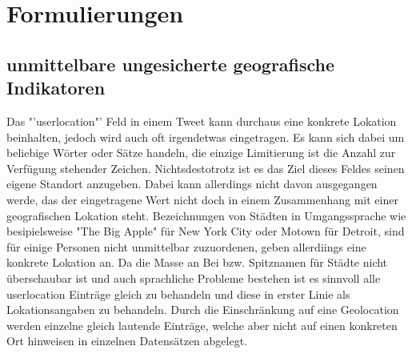 	  \section{Formulierungen}
	  	\subsection{unmittelbare ungesicherte geografische Indikatoren}
	  		Das "'userlocation"' Feld in einem Tweet kann durchaus eine konkrete Lokation beinhalten, jedoch wird auch oft irgendetwas eingetragen. \cite{Hecht2011}
	  		Es kann sich dabei um beliebige Wörter oder Sätze handeln, die einzige Limitierung ist die Anzahl zur Verfügung stehender Zeichen. Nichtsdestotrotz ist es das Ziel dieses Feldes seinen eigene Standort anzugeben.  Dabei kann allerdings nicht davon ausgegangen werde, das der eingetragene Wert nicht doch in einem Zusammenhang mit einer geografischen Lokation steht. 
	  		Bezeichnungen von Städten in Umgangssprache wie besipielsweise "The Big Apple" für New York City oder Motown für Detroit, sind für einige Personen nicht unmittelbar zuzuordenen, geben allerdiings eine konkrete Lokation an. Da die Masse an Bei bzw. Spitznamen für Städte nicht überschaubar ist und auch sprachliche Probleme bestehen ist es sinnvoll alle userlocation Einträge gleich zu behandeln und diese in erster Linie als Lokationsangaben zu behandeln. Durch die Einschränkung auf eine Geolocation werden einzelne gleich lautende Einträge, welche aber nicht auf einen konkreten Ort hinweisen in einzelnen Datensätzen abgelegt. 